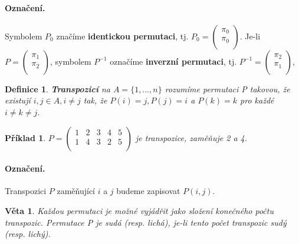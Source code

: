 \documentclass[12pt,a4paper]{article}
\newtheorem{definition}{Definice}
\newtheorem{sentence}{Věta}
\newtheorem{example}{Příklad}
\begin{document}
\paragraph{Označení.} Symbolem $P_0$ značíme \textbf{identickou permutaci}, tj. $P_0 = \left( \begin{array}{c} \pi_0 \\ \pi_0 \\ \end{array} \right)$. Je-li $P = \left( \begin{array}{c} \pi_1 \\ \pi_2 \\ \end{array} \right)$, symbolem $P^{-1}$ označíme \textbf{inverzní permutaci}, tj. $P^{-1} = \left( \begin{array}{c} \pi_2 \\ \pi_1 \\ \end{array} \right)$,

\begin{definition}
	\textbf{Transpozicí} na $A = \{1, \dots, n\}$ rozumíme permutaci P takovou, že existují $i,j \in A, i \not= j$ tak, že $P(i) = j, P(j) = i$ a $P(k) = k$ pro každé $i \not= k \not= j$.
\end{definition}

\begin{example}
	$P = \left( \begin{array}{cccccc} 1 & 2 & 3 & 4 & 5\\ 1 & 4 & 3 & 2 & 5 \\ \end{array} \right)$ je transpozice, zaměňuje 2 a 4.
\end{example}

\paragraph{Označení.} Transpozici $P$ zaměňující $i$ a $j$ budeme zapisovat $P(i,j)$.


\begin{sentence}
	Každou permutaci je možné vyjádřit jako složení konečného počtu transpozic. Permutace P je sudá (resp. lichá), je-li tento počet transpozic sudý (resp. lichý).
\end{sentence}
\end{document}
